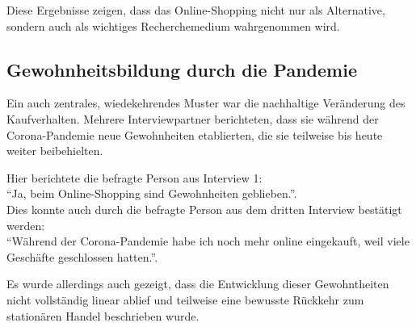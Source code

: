Diese Ergebnisse zeigen, dass das Online-Shopping nicht nur als Alternative, sondern auch als wichtiges Recherchemedium wahrgenommen wird.

\subsection{Gewohnheitsbildung durch die Pandemie}
Ein auch zentrales, wiedekehrendes Muster war die nachhaltige Veränderung des Kaufverhalten. Mehrere Interviewpartner berichteten, dass sie während der Corona-Pandemie neue Gewohnheiten etablierten, die sie teilweise bis heute weiter beibehielten.

Hier berichtete die befragte Person aus Interview 1:\\  \enquote{Ja, beim Online-Shopping sind Gewohnheiten geblieben.}.\\ Dies konnte auch durch die befragte Person aus dem dritten Interview bestätigt werden:
\\  \enquote{Während der Corona-Pandemie habe ich noch mehr online eingekauft, weil viele Geschäfte geschlossen hatten.}.

Es wurde allerdings auch gezeigt, dass die Entwicklung dieser Gewohntheiten nicht vollständig linear ablief und teilweise eine bewusste Rückkehr zum stationären Handel beschrieben wurde.